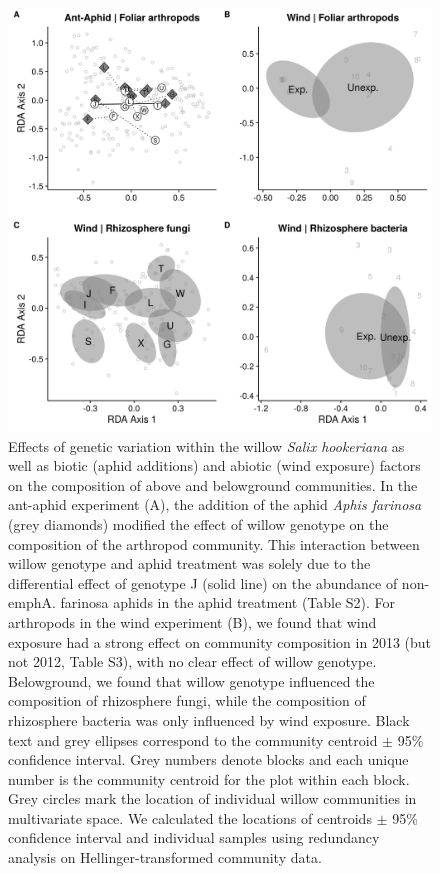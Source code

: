 \documentclass[11pt]{article}
\begin{document}
\begin{figure}[h!]
\centering
\includegraphics[scale = 0.4]{fig_2.png}
\caption{Effects of genetic variation within the willow
\emph{\textit{Salix hookeriana}} as well as biotic (aphid additions) and
abiotic (wind exposure) factors on the composition of above and
belowground communities. In the ant-aphid experiment (A), the addition
of the aphid \emph{Aphis farinosa} (grey diamonds) modified the
effect of willow genotype on the composition of the arthropod community.
This interaction between willow genotype and aphid treatment was solely
due to the differential effect of genotype J (solid line) on the
abundance of non-emph{A. farinosa} aphids in the aphid treatment (Table S2).
For arthropods in the wind experiment (B), we found that wind exposure
had a strong effect on community composition in 2013 (but not 2012,
Table S3), with no clear effect of willow genotype. Belowground, we
found that willow genotype influenced the composition of rhizosphere
fungi, while the composition of rhizosphere bacteria was only influenced
by wind exposure. Black text and grey ellipses correspond to the
community centroid $\pm$ 95\% confidence interval. Grey numbers denote
blocks and each unique number is the community centroid for the plot
within each block. Grey circles mark the location of individual willow
communities in multivariate space. We calculated the locations of
centroids $\pm$ 95\% confidence interval and individual samples using
redundancy analysis on Hellinger-transformed community data.}
\label{Fig:GxEcomp}
\end{figure}
\end{document}
